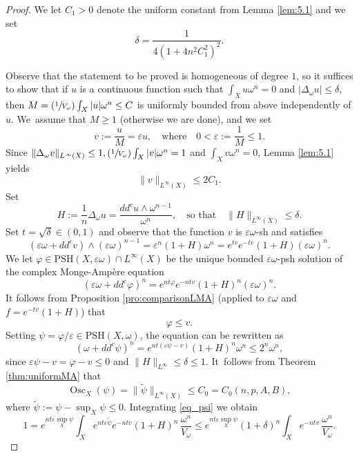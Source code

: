 \documentclass[JEP,XML,SOM,Unicode,published]{cedram}
\newcommand{\Psfrac}[2]{(\sfrac{#1}{#2})}
\DeclareMathOperator{\Osc}{Osc}
\theoremstyle{definition}
\let\e\varepsilon
\newcommand \PSH {\mathrm{PSH}}
\begin{document}
\begin{proof}
We let $C_1>0$ denote the uniform constant from Lemma \ref{lem:5.1} and we set
\[
\delta=\frac{1}{4(1+4n^2C_1^2)^{2}}.
\]

Observe that the statement to be proved is homogeneous of degree $1$, so it suffices to show that
if $u$ is a continuous function such that $\int_X u \omega^n=0$ and $|\Delta_{\omega} u| \leq \delta$,
then $M=\Psfrac{1}{V_\omega}\int_ X |u|\omega^n \leq C$ is uniformly bounded from above independently of $u$. We~assume that $M \geq 1$ (otherwise we are done), and we set
\[
v:=\frac{u}{M} =\varepsilon u,
\quad \text{where} \quad
0<\varepsilon:= \frac{1}{M}\leq 1.
\]
Since $\|\Delta_\omega v\|_{L^\infty(X)} \leq 1, \Psfrac{1}{V_\omega} \int_X |v|\omega^n=1$
and $\int_X v\omega^n=0$, Lemma \ref{lem:5.1} yields
\begin{equation}\label{eq_bound_v}
\|v\|_{L^\infty(X)} \leq 2C_1.
\end{equation}
Set
\[
H:=\frac{1}{n}\Delta_\omega u= \frac{dd^c u\wedge \omega^{n-1}}{\omega^n},
\quad \text{so that} \quad
\|H\|_{L^\infty(X)}\leq \delta.
\]
Set $t=\sqrt{\delta} \in (0,1)$ and observe that the function $v$ is $\varepsilon\omega$-sh
and satisfies
\[
(\varepsilon\omega+dd^c v)\wedge (\varepsilon\omega)^{n-1}=\varepsilon^n(1+H)\omega^n= e^{tv }e^{-tv}(1+H) (\varepsilon \omega)^n .
\]
We let $\varphi\in\PSH(X, \varepsilon \omega)\cap L^{\infty}(X)$ be the unique bounded
$\e\omega$-psh solution of the complex Monge-Ampère equation
\[
(\varepsilon \omega +dd^c \varphi )^n= e^{nt\varphi }e^{-ntv}(1+H)^n (\varepsilon \omega)^n.
\]
It follows from Proposition \ref{pro:comparisonLMA}
(applied to $\e \omega$ and $f=e^{-tv}(1+H)$) that
\begin{equation}\label{eq_phi_v}
\varphi\leq v.
\end{equation}
Setting $ \psi=\varphi/ \varepsilon \in\PSH(X, \omega)$, the equation can be rewritten as
\begin{equation}\label{eq_psi}
( \omega +dd^c \psi )^n= e^{nt(\varepsilon\psi-v )}(1+H)^n \omega^n \leq 2^n \omega^n,
\end{equation}
since $\varepsilon\psi-v=\varphi-v \leq 0$ and $\|H\|_{L^\infty}\leq \delta \leq 1$. It~follows from Theorem \ref{thm:uniformMA} that
\[
\Osc_X (\psi)= \|\tilde{\psi}\|_{L^\infty(X)}\leq C_0=C_0(n,p,A,B),
\]
where $\tilde{\psi}:=\psi-\sup_X \psi \leq 0$.
Integrating \eqref{eq_psi} we obtain
\[
1= e^{nt\varepsilon \sup_X \psi} \int_X e^{nt\varepsilon\tilde{\psi}}e^{-ntv}(1+H)^n\,\frac{\omega^n}{V_\omega}
\leq e^{nt\varepsilon \sup_X \psi}(1+\delta)^n\int_X e^{-ntv}\,\frac{\omega^n}{V_\omega}.
\]
\end{proof}
\end{document}
